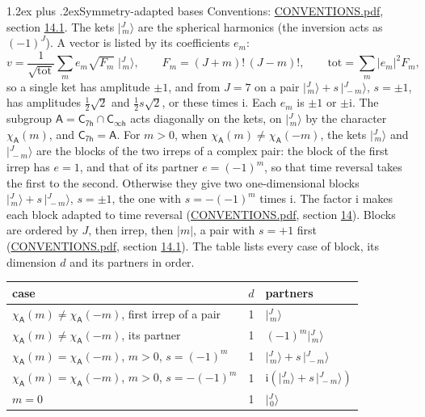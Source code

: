 \documentclass[10pt,a4paper]{article}
\makeatletter
\renewcommand\section{\@startsection{section}{1}{\z@}{-3ex plus -1ex minus -.2ex}%
  {1.2ex plus .2ex}{\normalfont\large\sffamily\bfseries\color{parttitle}}}
\numberwithin{equation}{section}
\newcommand{\grp}[1]{\mathsf{#1}}
\newcommand{\iunit}{\mathrm{i}}
\newcommand{\chiA}{\chi_{\grp{A}}}
\newcommand{\jm}[2]{\bigl\lvert{}^{#1}_{\,#2}\bigr\rangle}
\makeatother
\begin{document}
\section{Symmetry-adapted bases}\label{s:bases}
Conventions: \href{../../CONVENTIONS.pdf}{CONVENTIONS.pdf}, section \href{../../CONVENTIONS.pdf\#conv.14.1}{14.1}.
\leavevmode\label{n:index.m}\label{n:vector.ket}The kets $\jm{J}{m}$ are the spherical harmonics (the inversion acts as $(-1)^J$). \label{n:index.ketcoefficient}\label{n:vector.basis.symmetry}\label{n:index.ketweight}\label{n:index.total}A vector is listed by its coefficients $e_m$:
\begin{equation}\label{e:ket}v = \frac{1}{\sqrt{\mathrm{tot}}}\sum_m e_m\sqrt{F_m}\;\jm{J}{m},\qquad F_m = (J+m)!\,(J-m)!,\qquad \mathrm{tot} = \sum_m |e_m|^2F_m,\end{equation}
\leavevmode\label{n:index.pair.sign}so a single ket has amplitude $\pm1$, and from $J = 7$ on a pair $\jm{J}{m} + s\,\jm{J}{-m}$, $s = \pm1$, has amplitudes $\tfrac{1}{2}\sqrt{2}$ and $\tfrac{1}{2}s\sqrt{2}$, or these times $\iunit$. Each $e_m$ is $\pm1$ or $\pm\iunit$.
\leavevmode\label{n:group.A}\label{n:function.character.abelian}The subgroup $\grp{A} = \grp{C_{7h}}\cap\grp{C_{\infty h}}$ acts diagonally on the kets, on $\jm{J}{m}$ by the character $\chiA(m)$, and $\grp{C_{7h}} = \grp{A}$. For $m > 0$, when $\chiA(m) \ne \chiA(-m)$, the kets $\jm{J}{m}$ and $\jm{J}{-m}$ are the blocks of the two irreps of a complex pair: the block of the first irrep has $e = 1$, and that of its partner $e = (-1)^m$, so that time reversal takes the first to the second. Otherwise they give two one-dimensional blocks $\jm{J}{m} + s\,\jm{J}{-m}$, $s = \pm1$, the one with $s = -(-1)^m$ times $\iunit$. The factor $\iunit$ makes each block adapted to time reversal (\href{../../CONVENTIONS.pdf}{CONVENTIONS.pdf}, section \href{../../CONVENTIONS.pdf\#conv.14}{14}). Blocks are ordered by $J$, then irrep, then $|m|$, a pair with $s = +1$ first (\href{../../CONVENTIONS.pdf}{CONVENTIONS.pdf}, section \href{../../CONVENTIONS.pdf\#conv.14.1}{14.1}).
\leavevmode\label{n:head.case}\label{n:head.partners}The table lists every case of block, its dimension $d$ and its partners in order.
\begin{center}\begin{tabular}{@{}lrl@{}}\toprule
case & $d$ & partners\\\midrule
$\chiA(m) \ne \chiA(-m)$, first irrep of a pair & 1 & $\jm{J}{m}$\\
$\chiA(m) \ne \chiA(-m)$, its partner & 1 & $(-1)^m\jm{J}{m}$\\
$\chiA(m) = \chiA(-m)$, $m > 0$, $s = (-1)^m$ & 1 & $\jm{J}{m} + s\,\jm{J}{-m}$\\
$\chiA(m) = \chiA(-m)$, $m > 0$, $s = -(-1)^m$ & 1 & $\iunit(\jm{J}{m} + s\,\jm{J}{-m})$\\
$m = 0$ & 1 & $\jm{J}{0}$\\
\bottomrule\end{tabular}\end{center}
\end{document}
